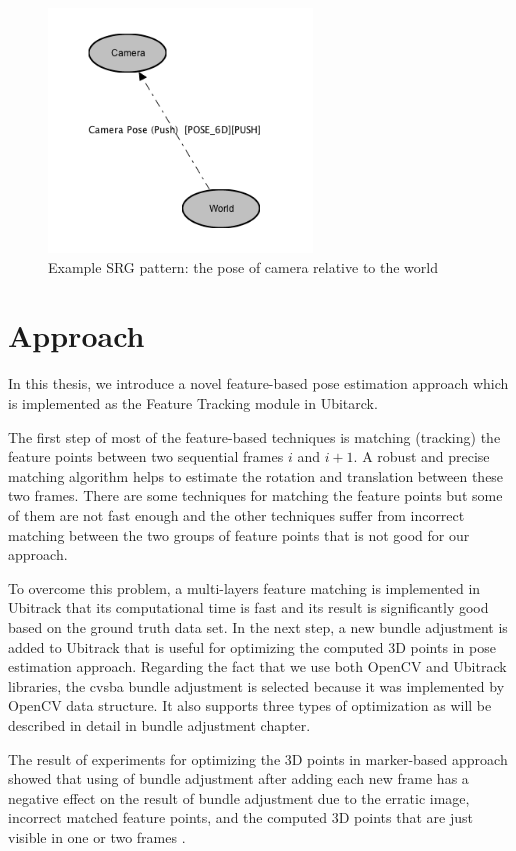 \begin{figure}[H]
  \centering
  \includegraphics[width=70mm]{figures/ubitrack}
  \caption{Example SRG pattern: the pose of camera relative to the world} \label{fig:ubitrack}
\end{figure}

\section {Approach} \label{sec:approach}
In this thesis, we introduce a novel feature-based pose estimation approach which is implemented as the Feature Tracking module in Ubitarck. 

The first step of most of the feature-based techniques is matching (tracking) the feature points between two sequential frames $i$ and $i+1$. A robust and precise matching algorithm helps to estimate the rotation and translation between these two frames. There are some techniques for matching the feature points but some of them are not fast enough and the other techniques suffer from incorrect matching between the two groups of feature points that is not good for our approach. 

To overcome this problem, a multi-layers feature matching is implemented in Ubitrack that its computational time is fast and its result is significantly good based on the ground truth data set. In the next step, a new bundle adjustment is added to Ubitrack that is useful for optimizing the computed 3D points in pose estimation approach. Regarding the fact that we use both OpenCV and Ubitrack libraries, the cvsba bundle adjustment is selected because it was implemented by OpenCV data structure. It also supports three types of optimization as will be  described in detail in bundle adjustment chapter.

The result of experiments for optimizing the 3D points in marker-based approach showed that using of bundle adjustment after adding each new frame has a negative effect on the result of bundle adjustment due to the erratic image, incorrect matched feature points, and the computed 3D points that are just visible in one or two frames \cite{barth2014marker}.

